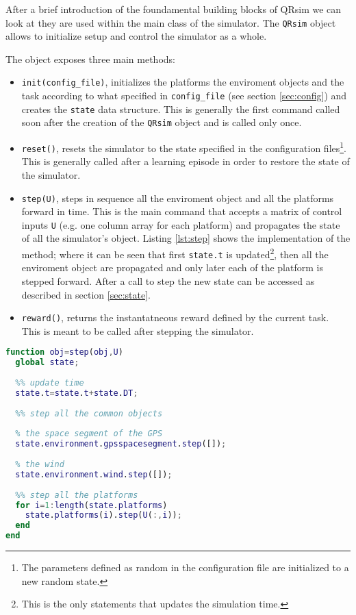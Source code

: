 \documentclass[a4paper,11pt]{report}
\newcommand{\sname}{QRsim\xspace}
\begin{document}
After a brief introduction of the foundamental building blocks of \sname we can look at they are used within the main class of the simulator. The \texttt{\sname} object allows to initialize setup and control the simulator as a whole. 

The object exposes three main methods:
\begin{itemize}
 \item \texttt{init(config\_file)}, initializes the platforms the enviroment objects and the task according to what specified in \texttt{config\_file} (see section \ref{sec:config}) and creates the \texttt{state} data structure. This is generally the first command called soon after the creation of the \texttt{\sname} object and is called only once.
 \item \texttt{reset()}, resets the simulator to the state specified in the configuration files\footnote{The parameters defined as random in the configuration file are initialized to a new random state.}. This is generally called after a learning episode in order to restore the state of the simulator. 
 \item \texttt{step(U)}, steps in sequence all the enviroment object and all the platforms forward in time. This is the main command that accepts a matrix of control inputs \texttt{U} (e.g. one column array for each platform) and propagates the state of all the simulator's object. Listing \ref{lst:step} shows the implementation of the method; where it can be seen that first \texttt{state.t} is updated\footnote{This is the only statements that updates the simulation time.}, then all the enviroment object are propagated and only later each of the platform is stepped forward.
 After a call to step the new state can be accessed as described in section \ref{sec:state}.
 \item \texttt{reward()}, returns the instantatneous reward defined by the current task. This is meant to be called after stepping the simulator.
\end{itemize}


\begin{lstlisting}[float=ht!bp,caption=\sname step() method,language=Matlab,frame=lines,label=lst:step,firstnumber=100]
function obj=step(obj,U)
  global state;
           
  %% update time
  state.t=state.t+state.DT;
                        
  %% step all the common objects
            
  % the space segment of the GPS
  state.environment.gpsspacesegment.step([]);
            
  % the wind
  state.environment.wind.step([]);
            
  %% step all the platforms            
  for i=1:length(state.platforms)
    state.platforms(i).step(U(:,i));
  end
end
\end{lstlisting}
\end{document}
